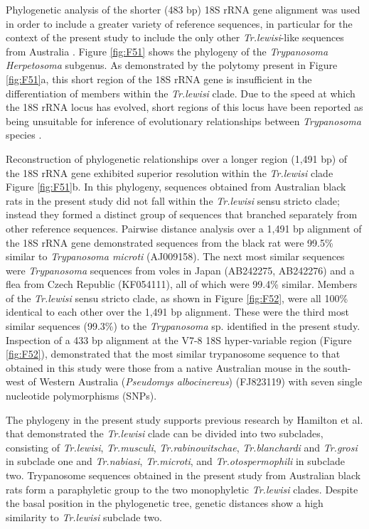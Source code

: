 \documentclass[a4paper, nobind]{templates/ociamthesis}
\begin{document}
Phylogenetic analysis of the shorter (483 bp) 18S rRNA gene alignment was used in order to include a greater variety of reference sequences, in particular for the context of the present study to include the only other \emph{Tr.lewisi}-like sequences from Australia \autocite{hamiltonInadvertentIntroductionAustralia2005,averisDiversityDistributionHostparasite2009}. Figure \ref{fig:F51} shows the phylogeny of the \emph{Trypanosoma} \emph{Herpetosoma} subgenus. As demonstrated by the polytomy present in Figure \ref{fig:F51}a, this short region of the 18S rRNA gene is insufficient in the differentiation of members within the \emph{Tr.lewisi} clade. Due to the speed at which the 18S rRNA locus has evolved, short regions of this locus have been reported as being unsuitable for inference of evolutionary relationships between \emph{Trypanosoma} species \autocite{hamiltonResolvingRelationshipsAustralian2011}.

Reconstruction of phylogenetic relationships over a longer region (1,491 bp) of the 18S rRNA gene exhibited superior resolution within the \emph{Tr.lewisi} clade Figure \ref{fig:F51}b. In this phylogeny, sequences obtained from Australian black rats in the present study did not fall within the \emph{Tr.lewisi} sensu stricto clade; instead they formed a distinct group of sequences that branched separately from other reference sequences. Pairwise distance analysis over a 1,491 bp alignment of the 18S rRNA gene demonstrated sequences from the black rat were 99.5\% similar to \emph{Trypanosoma microti} (AJ009158). The next most similar sequences were \emph{Trypanosoma} sequences from voles in Japan (AB242275, AB242276) and a flea from Czech Republic (KF054111), all of which were 99.4\% similar. Members of the \emph{Tr.lewisi} sensu stricto clade, as shown in Figure \ref{fig:F52}, were all 100\% identical to each other over the 1,491 bp alignment. These were the third most similar sequences (99.3\%) to the \emph{Trypanosoma} sp. identified in the present study. Inspection of a 433 bp alignment at the V7-8 18S hyper-variable region (Figure \ref{fig:F52}), demonstrated that the most similar trypanosome sequence to that obtained in this study were those from a native Australian mouse in the south-west of Western Australia (\emph{Pseudomys albocinereus}) (FJ823119) with seven single nucleotide polymorphisms (SNPs).

The phylogeny in the present study supports previous research by Hamilton et al. \autocite*{hamiltonInadvertentIntroductionAustralia2005} that demonstrated the \emph{Tr.lewisi} clade can be divided into two subclades, consisting of \emph{Tr.lewisi}, \emph{Tr.musculi}, \emph{Tr.rabinowitschae}, \emph{Tr.blanchardi} and \emph{Tr.grosi} in subclade one and \emph{Tr.nabiasi}, \emph{Tr.microti}, and \emph{Tr.otospermophili} in subclade two. Trypanosome sequences obtained in the present study from Australian black rats form a paraphyletic group to the two monophyletic \emph{Tr.lewisi} clades. Despite the basal position in the phylogenetic tree, genetic distances show a high similarity to \emph{Tr.lewisi} subclade two.
\end{document}
